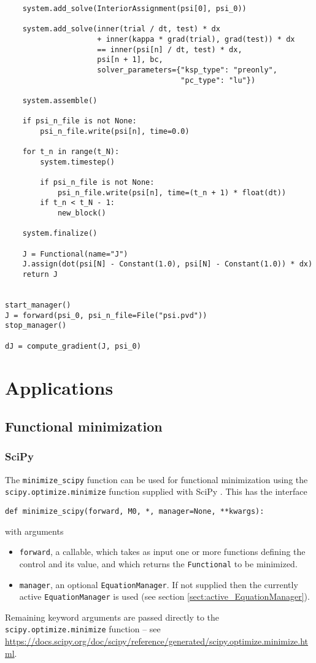 \documentclass[11pt]{article}
\begin{document}
\begin{lstlisting}
    system.add_solve(InteriorAssignment(psi[0], psi_0))

    system.add_solve(inner(trial / dt, test) * dx
                     + inner(kappa * grad(trial), grad(test)) * dx
                     == inner(psi[n] / dt, test) * dx,
                     psi[n + 1], bc,
                     solver_parameters={"ksp_type": "preonly",
                                        "pc_type": "lu"})

    system.assemble()

    if psi_n_file is not None:
        psi_n_file.write(psi[n], time=0.0)

    for t_n in range(t_N):
        system.timestep()

        if psi_n_file is not None:
            psi_n_file.write(psi[n], time=(t_n + 1) * float(dt))
        if t_n < t_N - 1:
            new_block()

    system.finalize()

    J = Functional(name="J")
    J.assign(dot(psi[N] - Constant(1.0), psi[N] - Constant(1.0)) * dx)
    return J


start_manager()
J = forward(psi_0, psi_n_file=File("psi.pvd"))
stop_manager()

dJ = compute_gradient(J, psi_0)
\end{lstlisting}

\section{Applications}

\subsection{Functional minimization}\label{sect:minimization}

\subsubsection{SciPy}

The \texttt{minimize\_scipy} function can be used for functional minimization
using the \texttt{scipy.optimize.minimize} function supplied with SciPy
\citep{virtanen2020}. This has the interface
\begin{lstlisting}
def minimize_scipy(forward, M0, *, manager=None, **kwargs):
\end{lstlisting}
with arguments
\begin{itemize}
  \item \texttt{forward}, a callable, which takes as input one or more
    functions defining the control and its value, and which returns the
    \texttt{Functional} to be minimized.
  \item \texttt{manager}, an optional \texttt{EquationManager}. If not supplied
    then the currently active \texttt{EquationManager} is used (see section
    \ref{sect:active_EquationManager}).
\end{itemize}
Remaining keyword arguments are passed directly to the
\texttt{scipy.optimize.minimize} function -- see
\url{https://docs.scipy.org/doc/scipy/reference/generated/scipy.optimize.minimize.html}.
\end{document}
